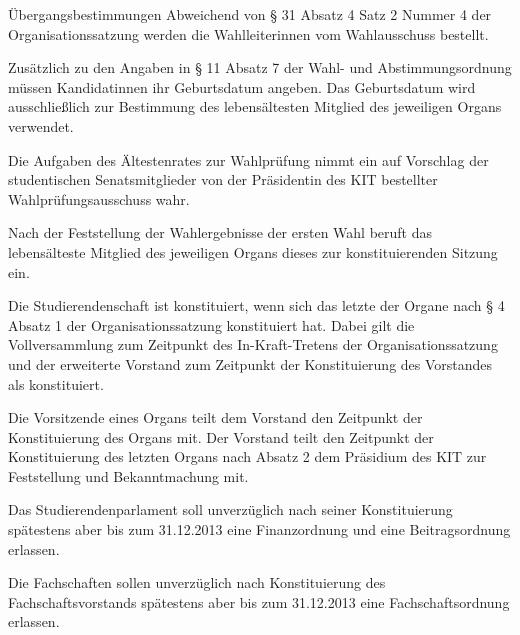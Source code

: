 \begin{jurdoc}{Übergangsbestimmungen}
Abweichend von § 31 Absatz 4 Satz 2 Nummer 4 der Organisationssatzung werden die Wahlleiterinnen vom Wahlausschuss bestellt.

Zusätzlich zu den Angaben in  § 11 Absatz 7 der Wahl- und Abstimmungsordnung müssen Kandidatinnen ihr Geburtsdatum angeben. Das Geburtsdatum wird ausschließlich zur Bestimmung des lebensältesten Mitglied des jeweiligen Organs verwendet.

Die Aufgaben des Ältestenrates  zur Wahlprüfung nimmt ein auf Vorschlag der studentischen Senatsmitglieder von der Präsidentin des KIT bestellter Wahlprüfungsausschuss wahr.


\label{konstituierung}

Nach der Feststellung der Wahlergebnisse der ersten Wahl beruft das lebensälteste Mitglied des jeweiligen Organs dieses zur konstituierenden Sitzung ein.

Die Studierendenschaft ist konstituiert, wenn sich das letzte der Organe nach § 4 Absatz 1 der Organisationssatzung konstituiert hat. Dabei gilt die Vollversammlung zum Zeitpunkt des In-Kraft-Tretens der Organisationssatzung und der erweiterte Vorstand zum Zeitpunkt der Konstituierung des Vorstandes als konstituiert.

Die Vorsitzende eines Organs teilt dem Vorstand den Zeitpunkt der Konstituierung des Organs mit. Der Vorstand teilt den Zeitpunkt der Konstituierung des letzten Organs nach Absatz 2 dem Präsidium des KIT zur Feststellung und Bekanntmachung mit.


Das Studierendenparlament soll unverzüglich nach seiner Konstituierung spätestens aber bis zum 31.12.2013 eine Finanzordnung und eine Beitragsordnung erlassen.

Die Fachschaften sollen unverzüglich nach Konstituierung des Fachschaftsvorstands spätestens aber bis zum 31.12.2013 eine Fachschaftsordnung erlassen.

\end{jurdoc}
